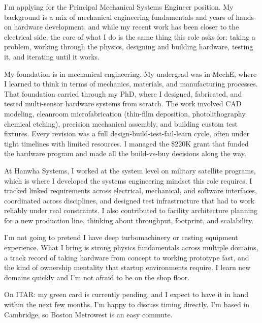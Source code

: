 \documentclass[letterpaper,11pt]{moderncv}
\date{\today}
\begin{document}
\makelettertitle

I'm applying for the Principal Mechanical Systems Engineer position. My background is a mix of mechanical engineering fundamentals and years of hands-on hardware development, and while my recent work has been closer to the electrical side, the core of what I do is the same thing this role asks for: taking a problem, working through the physics, designing and building hardware, testing it, and iterating until it works.

My foundation is in mechanical engineering. My undergrad was in MechE, where I learned to think in terms of mechanics, materials, and manufacturing processes. That foundation carried through my PhD, where I designed, fabricated, and tested multi-sensor hardware systems from scratch. The work involved CAD modeling, cleanroom microfabrication (thin-film deposition, photolithography, chemical etching), precision mechanical assembly, and building custom test fixtures. Every revision was a full design-build-test-fail-learn cycle, often under tight timelines with limited resources. I managed the \$220K grant that funded the hardware program and made all the build-vs-buy decisions along the way.

At Hanwha Systems, I worked at the system level on military satellite programs, which is where I developed the systems engineering mindset this role requires. I tracked linked requirements across electrical, mechanical, and software interfaces, coordinated across disciplines, and designed test infrastructure that had to work reliably under real constraints. I also contributed to facility architecture planning for a new production line, thinking about throughput, footprint, and scalability.

I'm not going to pretend I have deep turbomachinery or casting equipment experience. What I bring is strong physics fundamentals across multiple domains, a track record of taking hardware from concept to working prototype fast, and the kind of ownership mentality that startup environments require. I learn new domains quickly and I'm not afraid to be on the shop floor.

On ITAR: my green card is currently pending, and I expect to have it in hand within the next few months. I'm happy to discuss timing directly. I'm based in Cambridge, so Boston Metrowest is an easy commute.

\makeletterclosing

\newpage

\makecvtitle
\vspace{-3em}
\end{document}
